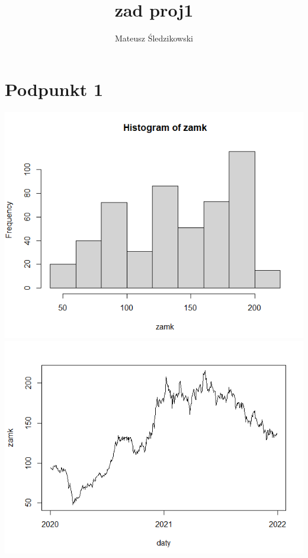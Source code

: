 \documentclass{article}
\title{zad proj1}
\author{Mateusz Śledzikowski }
\begin{document}
\maketitle

\section{Podpunkt 1}
\includegraphics[scale=0.6]{histogram.png}
\includegraphics[scale=0.6]{wykres.png}
\end{document}
